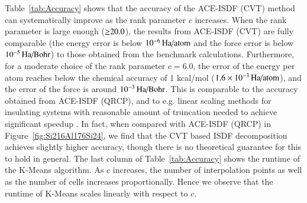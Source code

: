 Table~\ref{tab:Accuracy} shows that the accuracy of the ACE-ISDF (CVT) method
can systematically improve as the rank parameter $c$ increases. When the rank
parameter is large enough ($\mathbin{\Geq}20.0$), the results from ACE-ISDF 
(CVT) are fully comparable (the energy error is below $10^{-6}\HaPA$ and the
force error is below $10^{-5}\HaPB$) to those obtained from the benchmark
calculations. Furthermore, for a moderate choice of the rank parameter $c=6.0$,
the error of the energy per atom reaches below the chemical accuracy of 1
kcal/mol ($1.6\times 10^{-3}\HaPA$), and the error of the force is around $10^
{-3}\HaPB$. This is comparable to the accuracy obtained from ACE-ISDF (QRCP),
and to e.g. linear scaling methods for insulating systems with reasonable amount
of truncation needed to achieve significant speedup \cite{JCTC_11_4655_2015}. In
fact, when compared with ACE-ISDF (QRCP) in Figure~\ref{fig:Si216Al176Si24}, we
find that the CVT based ISDF decomposition achieves slightly higher accuracy,
though there is no theoretical guarantee for this to hold in general. The last
column of Table~\ref{tab:Accuracy} shows the runtime of the K-Means algorithm.
As $c$ increases, the number of interpolation points as well as the number of
cells increases proportionally. Hence we observe that the runtime of K-Means
scales linearly with respect to $c$.

